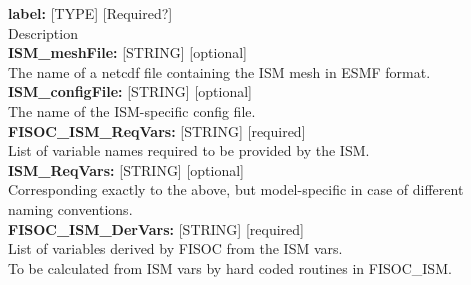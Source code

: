\documentclass[12pt]{article}
\begin{document}
\begin{flushleft}
\textbf{label:}               [TYPE]   [Required?]                         \\
Description                                                                \\
\vspace{6pt}
\vspace{6pt}
\textbf{ISM\_meshFile:}       [STRING] [optional]                          \\
The name of a netcdf file containing the ISM mesh in ESMF format.          \\
\vspace{6pt}
\textbf{ISM\_configFile:}     [STRING] [optional]                          \\
The name of the ISM-specific config file.                                  \\
\vspace{6pt}
\textbf{FISOC\_ISM\_ReqVars:} [STRING] [required]                          \\
List of variable names required to be provided by the ISM.                 \\
\vspace{6pt}
\textbf{ISM\_ReqVars:}        [STRING] [optional]                          \\
Corresponding exactly to the above, but model-specific in case of different naming conventions. \\
\vspace{6pt}
\textbf{FISOC\_ISM\_DerVars:} [STRING] [required]                          \\
List of variables derived by FISOC from the ISM vars.                      \\ 
To be calculated from ISM vars by hard coded routines in FISOC\_ISM.       \\
\vspace{6pt}


\end{flushleft}
\end{document}
